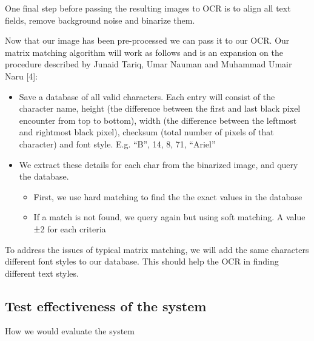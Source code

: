 \documentclass[a4paper,12pt]{article}
\begin{document}
One final step before passing the resulting images to OCR is to align all text fields, remove background noise and binarize them.

Now that our image has been pre-processed we can pass it to our OCR. Our matrix matching algorithm will work as follows and is an expansion on the procedure described by Junaid Tariq, Umar Nauman and Muhammad Umair Naru [4]:

\begin{itemize}
\item
Save a database of all valid characters. Each entry will consist of the character name, height (the difference between the first and last black pixel encounter from top to bottom), width (the difference between the leftmost and rightmost black pixel), checksum (total number of pixels of that character) and font style. E.g. “B”, 14, 8, 71, “Ariel”
\item
We extract these details for each char from the binarized image, and query the database.
\begin{itemize}
\item
First, we use hard matching to find the the exact values in the database
\item
If a match is not found, we query again but using soft matching. A value ±2 for each criteria
\end{itemize}
\end{itemize}

To address the issues of typical matrix matching, we will add the same characters different font styles to our database. This should help the OCR in finding different text styles. 

\subsection{Test effectiveness of the system}
How we would evaluate the system

\newpage
\theendnotes
\end{document}
